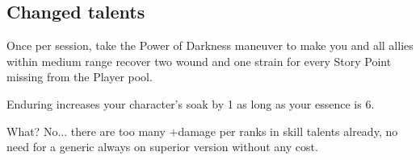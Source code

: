 \documentclass{book}
\begin{document}
\begin{multicols}{2}
\subsection{Changed talents}
 Once per session, take the Power of Darkness maneuver to make you and all allies within medium range recover two wound and one strain for every Story Point missing from the Player pool. %

 Enduring increases your character's soak by 1 as long as your essence is 6.

 What? No... there are too many +damage per ranks in skill talents already, no need for a generic always on superior version without any cost.


\end{multicols}
	
\end{document}
